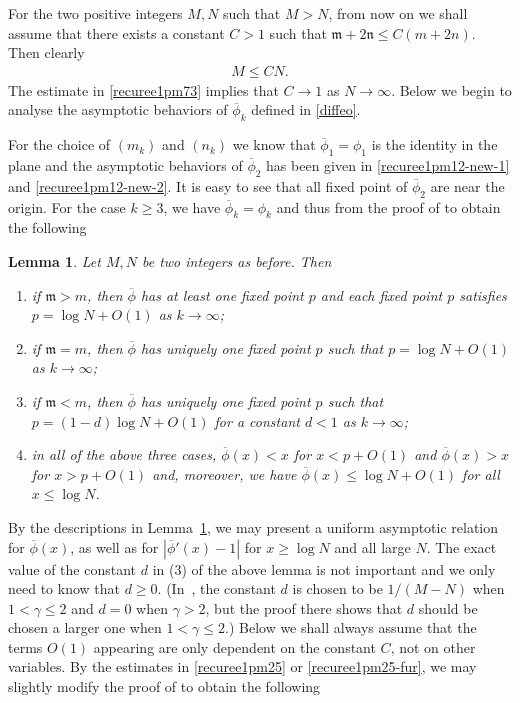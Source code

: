 \documentclass[12pt]{amsart}
\numberwithin{equation}{section}
\newtheorem{lemma}[theorem]{Lemma}
\begin{document}
For the two positive integers $M,N$ such that $M>N$, from now on we shall assume that there exists a constant $C>1$ such that $\mathfrak{m}+2\mathfrak{n}\leq C(m+2n)$. Then clearly
\begin{equation}\label{recuree1pm31}
\begin{split}
M\leq CN.
\end{split}
\end{equation}
The estimate in \eqref{recuree1pm73} implies that $C\to1$ as $N\to\infty$. Below we begin to analyse the asymptotic behaviors of $\overline{\phi}_k$ defined in \eqref{diffeo}.

For the choice of $(m_k)$ and $(n_k)$ we know that $\overline{\phi}_1=\phi_1$ is the identity in the plane and the asymptotic behaviors of $\overline{\phi}_2$ has been given in \eqref{recuree1pm12-new-1} and \eqref{recuree1pm12-new-2}. It is easy to see that all fixed point of $\overline{\phi}_2$ are near the origin. For the case $k\geq 3$, we have $\overline{\phi}_k=\phi_k$ and thus from the proof of \cite[Lemma~2.5]{Zhang2024} to obtain the following

\begin{lemma}\label{Lemma4}
Let $M,N$ be two integers as before. Then
\begin{enumerate}
  \item [(1)] if $\mathfrak{m}>m$, then $\overline{\phi}$ has at least one fixed point $p$ and each fixed point $p$ satisfies $p=\log N+O(1)$ as $k\to\infty$;
  \item [(2)] if $\mathfrak{m}=m$, then $\overline{\phi}$ has uniquely one fixed point $p$ such that $p=\log N+O(1)$ as $k\to\infty$;
  \item [(3)] if $\mathfrak{m}<m$, then $\overline{\phi}$ has uniquely one fixed point $p$ such that $p=(1-d)\log N+O(1)$ for a constant $d<1$ as $k\to\infty$;
  \item [(4)] in all of the above three cases, $\overline{\phi}(x)<x$ for $x<p+O(1)$ and $\overline{\phi}(x)>x$ for $x>p+O(1)$ and, moreover, we have $\overline{\phi}(x)\leq \log N+O(1)$ for all $x\leq\log N$.
\end{enumerate}

\end{lemma}

By the descriptions in Lemma~\ref{Lemma4}, we may present a uniform asymptotic relation for $\overline{\phi}(x)$, as well as for $|\overline{\phi}'(x)-1|$ for $x\geq\log N$ and all large $N$. The exact value of the constant $d$ in (3) of the above lemma is not important and we only need to know that $d\geq 0$. (In~\cite[Lemma~2.5]{Zhang2024}, the constant $d$ is chosen to be $1/(M-N)$ when $1<\gamma \leq 2$ and $d=0$ when $\gamma>2$, but the proof there shows that $d$ should be chosen a larger one when $1<\gamma\leq 2$.) Below we shall always assume that the terms $O(1)$ appearing are only dependent on the constant $C$, not on other variables. By the estimates in \eqref{recuree1pm25} or \eqref{recuree1pm25-fur}, we may slightly modify the proof of \cite[Lemma~2.6]{Zhang2024} to obtain the following
\end{document}
